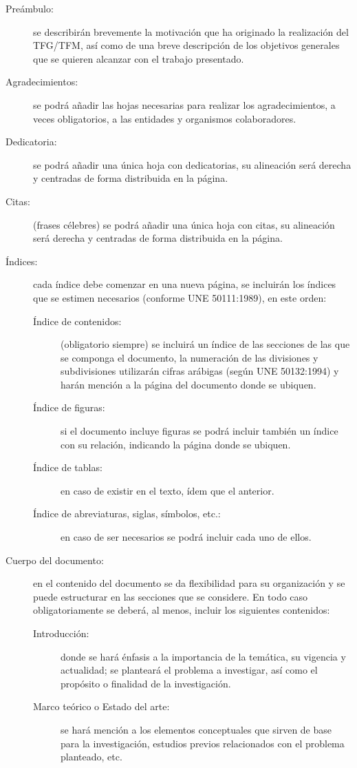 \begin{description}
\item[Preámbulo:] se describirán brevemente la motivación que ha originado la realización del TFG/TFM, así como de una breve descripción de los objetivos generales que se quieren alcanzar con el trabajo presentado.
\item[Agradecimientos:] se podrá añadir las hojas necesarias para realizar los agradecimientos, a veces obligatorios, a las entidades y organismos colaboradores.
\item[Dedicatoria:] se podrá añadir una única hoja con dedicatorias, su alineación será derecha y centradas de forma distribuida en la página.
\item[Citas:] (frases célebres) se podrá añadir una única hoja con citas, su alineación será derecha y centradas de forma distribuida en la página.
\item[Índices:] cada índice debe comenzar en una nueva página, se incluirán los índices que se estimen necesarios (conforme UNE 50111:1989), en este orden:
\begin{description}
\item[Índice de contenidos:] (obligatorio siempre) se incluirá un índice de las secciones de las que se componga el documento, la numeración de las 
divisiones y subdivisiones utilizarán cifras arábigas (según UNE 50132:1994) y harán mención a la página del documento donde se ubiquen.
\item[Índice de figuras:] si el documento incluye figuras se podrá incluir también un índice con su relación, indicando la página donde se ubiquen.
\item[Índice de tablas:] en caso de existir en el texto, ídem que el anterior.
\item[Índice de abreviaturas, siglas, símbolos, etc.:] en caso de ser necesarios se podrá incluir cada uno de ellos.
\end{description}
\item[Cuerpo del documento:] en el contenido del documento se da flexibilidad para su organización y se puede estructurar en las secciones que se considere. En todo caso obligatoriamente se deberá, al menos, incluir los siguientes contenidos:
\begin{description}
\item[Introducción:] donde se hará énfasis a la importancia de la temática, su vigencia y actualidad; se planteará el problema a investigar, así como el propósito o finalidad de la investigación.
\item[Marco teórico o Estado del arte:] se hará mención a los elementos conceptuales que sirven de base para la investigación, estudios previos relacionados con el problema planteado, etc.

\end{description}
\end{description}
